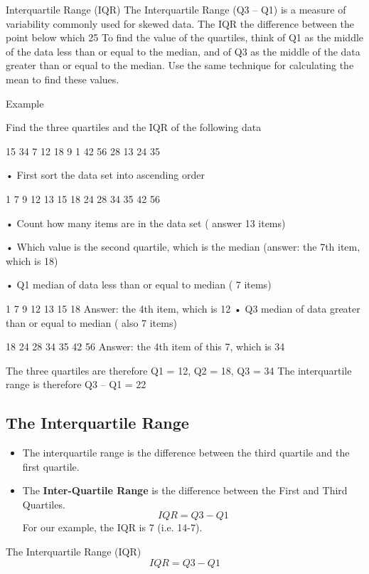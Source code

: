 Interquartile Range (IQR)
The Interquartile Range (Q3 – Q1) is a  measure of variability commonly used for skewed data.
The IQR  the difference between the point below which 25%
To find the value of the quartiles, think of Q1 as the middle of the data less than or equal to the median, and of Q3 as the middle of the data greater than or equal to the median.
Use the same technique for calculating the mean to find these values.






Example

Find the three quartiles and the IQR of the following data

 15  34  7  12  18  9  1  42  56  28  13  24  35

•	First sort the data set into ascending order

1 7  9 12 13 15 18  24 28 34 35 42 56

•	Count how many items are in the data set ( answer 13 items)

•	Which value is the second quartile, which is the median (answer: the 7th item, which is 18)

•	Q1  median of data less than or equal to median ( 7 items)

1	7  9 12 13 15 18 
 Answer: the 4th item, which is 12
•	Q3  median of data greater than or equal to median ( also 7 items)

18  24 28 34 35 42 56 
Answer: the 4th item of this 7, which is 34

The three quartiles are therefore Q1 = 12, Q2 = 18, Q3 = 34
The interquartile range is therefore Q3 – Q1 = 22



\subsection*{The Interquartile Range}
\begin{itemize}
\item The interquartile range is the difference between the third quartile and the first quartile.
\item The \textbf{Inter-Quartile Range} is the difference between the First and Third Quartiles.
\[ IQR = Q3-Q1\]
For our example, the IQR is 7 (i.e. 14-7).
\end{itemize}



The Interquartile Range (IQR)
\[IQR =Q3-Q1\]



